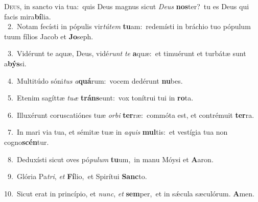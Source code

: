 \lettrine{\initial\textcolor{\initialcolor}{D}}{eus,} in sancto via tua:~\dagger quis Deus magnus sicut \textit{De}\-\textit{us} \textbf{nos}\-ter?~\star tu es Deus qui facis mira\-\textbf{bí}\-lia.\\
{\numbfont\textcolor{\numbcolor}{~2.}}~Notam fecísti in pópulis vir\-\textit{tú}\-\textit{tem} \textbf{tu}\-am:~\star redemísti in bráchio tuo pópulum tuum fílios Jacob et \textbf{Jo}\-seph.\par
{\numbfont\textcolor{\numbcolor}{~3.}}~Vidérunt te aquæ, Deus, vidé\textit{runt} \textit{te} \textbf{a}\-quæ:~\star et timuérunt et turbátæ sunt a\-\textbf{býs}\-si.\par
{\numbfont\textcolor{\numbcolor}{~4.}}~Multitúdo sóni\textit{tus} \textit{a}\-\textbf{quá}rum:~\star vocem dedérunt \textbf{nu}\-bes.\par
{\numbfont\textcolor{\numbcolor}{~5.}}~Etenim sagíttæ \textit{tu}\-\textit{æ} \textbf{tráns}\-eunt:~\star vox tonítrui tui in \textbf{ro}\-ta.\par
{\numbfont\textcolor{\numbcolor}{~6.}}~Illuxérunt coruscatiónes tuæ \textit{or}\-\textit{bi} \textbf{ter}\-ræ:~\star commóta est, et contrémuit \textbf{ter}\-ra.\par
{\numbfont\textcolor{\numbcolor}{~7.}}~In mari via tua, et sémitæ tuæ in \textit{a}\-\textit{quis} \textbf{mul}\-tis:~\star et vestígia tua non cogno\-\textbf{scén}\-tur.\par
{\numbfont\textcolor{\numbcolor}{~8.}}~Deduxísti sicut oves pó\-\textit{pu}\-\textit{lum} \textbf{tu}\-um,~\star in manu Móysi et \textbf{A}\-aron.\par
{\numbfont\textcolor{\numbcolor}{~9.}}~Glória Pa\-\textit{tri}\-, \textit{et} \textbf{Fí}\-lio,~\star et Spirítui \textbf{Sanc}\-to.\par
{\numbfont\textcolor{\numbcolor}{10.}}~Sicut erat in princípio, et \textit{nunc}\-, \textit{et} \textbf{sem}\-per,~\star et in sǽcula sæculórum. \textbf{A}\-men.\par
